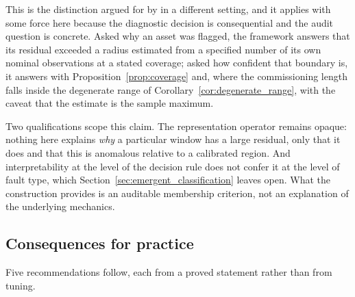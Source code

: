 \documentclass[a4paper]{cas-sc}
\begin{document}
This is the distinction argued for by \citet{rudin2019} in a different
setting, and it applies with some force here because the diagnostic decision
is consequential and the audit question is concrete. Asked why an asset was
flagged, the framework answers that its residual exceeded a radius estimated
from a specified number of its own nominal observations at a stated coverage;
asked how confident that boundary is, it answers with
Proposition~\ref{prop:coverage} and, where the commissioning length falls
inside the degenerate range of
Corollary~\ref{cor:degenerate_range}, with the caveat that the estimate is the
sample maximum.

Two qualifications scope this claim. The representation operator remains
opaque: nothing here explains \emph{why} a particular window has a large
residual, only that it does and that this is anomalous relative to a
calibrated region. And interpretability at the level of the decision rule does
not confer it at the level of fault type, which
Section~\ref{sec:emergent_classification} leaves open. What the construction
provides is an auditable membership criterion, not an explanation of the
underlying mechanics.

\subsection{Consequences for practice}
\label{subsec:disc_practice}

Five recommendations follow, each from a proved statement rather than from
tuning.
\end{document}
